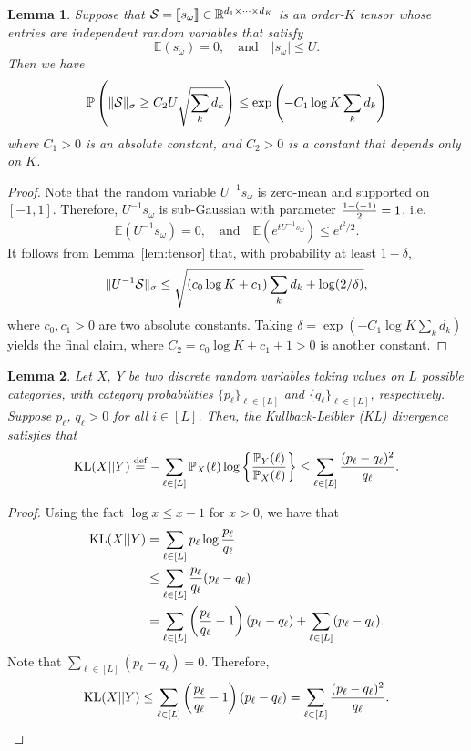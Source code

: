 \documentclass[11pt]{article}
\theoremstyle{plain}
\newtheorem{lem}{Lemma}
\theoremstyle{definition}
\begin{document}
\begin{lem} \label{lem:noisytensor}
Suppose that $\mathcal{S}=\llbracket s_{\omega} \rrbracket\in\mathbb{R}^{d_1\times \cdots \times d_K}$ is an order-$K$ tensor whose entries are independent random variables that satisfy
\[
\mathbb{E}(s_{\omega})=0,\quad \text{and}\quad |s_{\omega}|\leq U.
\]
Then we have
\[
\mathbb{P}\left(\lVert\mathcal{S}\rVert_\sigma\geq C_2 U\sqrt{\sum_k d_k} \right)\leq \exp\left(-C_1  \log K \sum_k d_k\right)
\]
where $C_1>0$ is an absolute constant, and $C_2>0$ is a constant that depends only on $K$.
\end{lem}

\begin{proof}  Note that the random variable $U^{-1}s_{\omega}$ is zero-mean and supported on $[-1,1]$. Therefore, $U^{-1}s_{\omega}$ is sub-Gaussian with parameter ${1-(-1)\over 2}=1$, i.e.
\[
\mathbb{E}(U^{-1}s_{\omega})=0,\quad \text{and}\quad \mathbb{E}(e^{tU^{-1}s_{\omega}})\leq e^{t^2/2}.
\]
It follows from Lemma~\ref{lem:tensor} that, with probability at least $1-\delta$,
\[
\lVert U^{-1}\mathcal{S}\rVert_\sigma\leq \sqrt{\left(c_0\log K+c_1\right) \sum_k d_k +\log (2/\delta)},
\]
where $c_0, c_1>0$ are two absolute constants. Taking $\delta=\exp (-C_1\log K \sum_k d_k)$ yields the final claim, where $C_2=c_0\log K+c_1+1>0$ is another constant.
\end{proof}


\begin{lem}\label{lem:KLentry} Let $X,\; Y$ be two discrete random variables taking values on $L$ possible categories, with category probabilities $\{p_\ell\}_{\ell\in[L]}$ and $\{q_\ell\}_{\ell\in[L]}$, respectively.  Suppose $p_\ell$, $q_\ell>0$ for all $i\in[L]$. Then, the Kullback-Leibler (KL) divergence satisfies that
\[
\text{KL}(X||Y)\stackrel{\text{def}}{=}-\sum_{\ell\in[L]}\mathbb{P}_X(\ell)\log\left\{{\mathbb{P}_Y(\ell)\over \mathbb{P}_X(\ell)}\right\} \leq \sum_{\ell \in [L]}{(p_\ell-q_\ell)^2 \over q_\ell}.
\]
\end{lem}
\begin{proof} Using the fact $\log x\leq x-1$ for $x>0$, we have that
\begin{align}\label{eq:KL}
\text{KL}(X||Y)&=\sum_{\ell\in[L]}p_\ell\log{p_\ell\over q_\ell}\\
&\leq \sum_{\ell\in[L]} {p_\ell\over q_\ell}(p_\ell-q_\ell)\\
&=\sum_{\ell\in[L]} \left({p_\ell\over q_\ell }- 1\right)(p_\ell-q_\ell)+ \sum_{\ell\in[L]} (p_\ell-q_\ell).
\end{align}
Note that $\sum_{\ell\in[L]}(p_\ell-q_\ell)=0$. Therefore,
\[
\text{KL}(X||Y)\leq \sum_{\ell\in[L]}\left( {p_\ell\over q_\ell}-1\right)\left(p_\ell-q_\ell\right)=\sum_{\ell\in[L]}{(p_\ell-q_\ell)^2\over q_\ell}.
\]
\end{proof}
\end{document}
